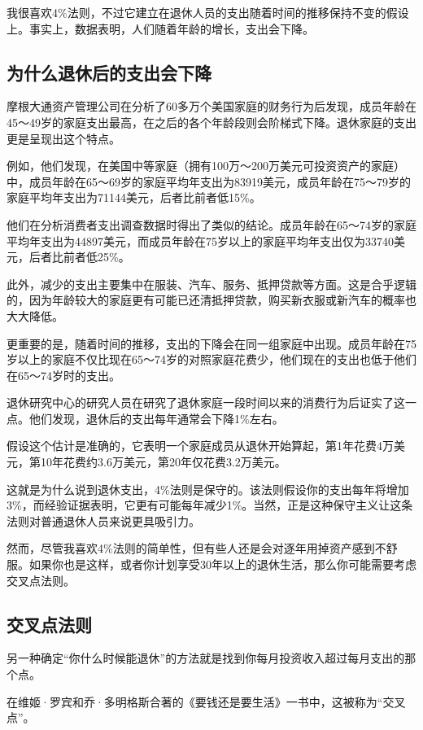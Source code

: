 我很喜欢4\%法则，不过它建立在退休人员的支出随着时间的推移保持不变的假设上。事实上，数据表明，人们随着年龄的增长，支出会下降。

\subsection{为什么退休后的支出会下降}
摩根大通资产管理公司在分析了60多万个美国家庭的财务行为后发现，成员年龄在45～49岁的家庭支出最高，在之后的各个年龄段则会阶梯式下降。退休家庭的支出更是呈现出这个特点。

例如，他们发现，在美国中等家庭（拥有100万～200万美元可投资资产的家庭）中，成员年龄在65～69岁的家庭平均年支出为83919美元，成员年龄在75～79岁的家庭平均年支出为71144美元，后者比前者低15\%。

他们在分析消费者支出调查数据时得出了类似的结论。成员年龄在65～74岁的家庭平均年支出为44897美元，而成员年龄在75岁以上的家庭平均年支出仅为33740美元，后者比前者低25\%。

此外，减少的支出主要集中在服装、汽车、服务、抵押贷款等方面。这是合乎逻辑的，因为年龄较大的家庭更有可能已还清抵押贷款，购买新衣服或新汽车的概率也大大降低。

更重要的是，随着时间的推移，支出的下降会在同一组家庭中出现。成员年龄在75岁以上的家庭不仅比现在65～74岁的对照家庭花费少，他们现在的支出也低于他们在65～74岁时的支出。

退休研究中心的研究人员在研究了退休家庭一段时间以来的消费行为后证实了这一点。他们发现，退休后的支出每年通常会下降1\%左右。

假设这个估计是准确的，它表明一个家庭成员从退休开始算起，第1年花费4万美元，第10年花费约3.6万美元，第20年仅花费3.2万美元。

这就是为什么说到退休支出，4\%法则是保守的。该法则假设你的支出每年将增加3\%，而经验证据表明，它更有可能每年减少1\%。当然，正是这种保守主义让这条法则对普通退休人员来说更具吸引力。

然而，尽管我喜欢4\%法则的简单性，但有些人还是会对逐年用掉资产感到不舒服。如果你也是这样，或者你计划享受30年以上的退休生活，那么你可能需要考虑交叉点法则。

\subsection{交叉点法则}
另一种确定“你什么时候能退休”的方法就是找到你每月投资收入超过每月支出的那个点。

在维姬·罗宾和乔·多明格斯合著的《要钱还是要生活》一书中，这被称为“交叉点”。

